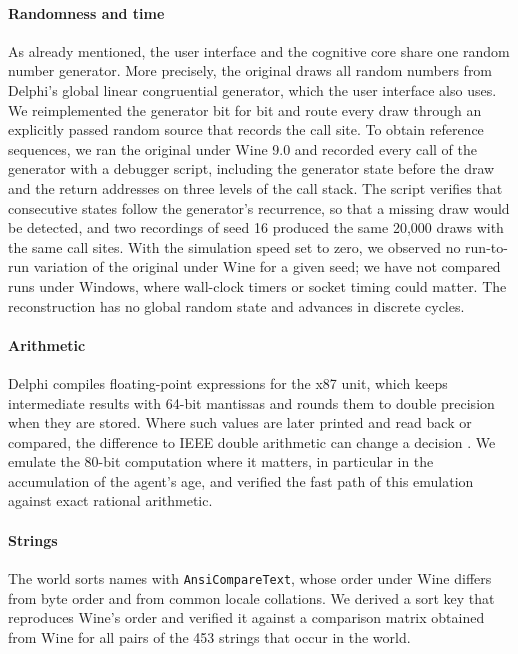 \documentclass[preprint,12pt,authoryear]{elsarticle}
\newcommand{\code}[1]{\texttt{#1}}
\begin{document}
\paragraph{Randomness and time} As already mentioned, the user interface and the cognitive core share one random number generator. More precisely, the original draws all random numbers from Delphi's global linear congruential generator, which the user interface also uses. We reimplemented the generator bit for bit and route every draw through an explicitly passed random source that records the call site. To obtain reference sequences, we ran the original under Wine 9.0 and recorded every call of the generator with a debugger script, including the generator state before the draw and the return addresses on three levels of the call stack. The script verifies that consecutive states follow the generator's recurrence, so that a missing draw would be detected, and two recordings of seed 16 produced the same 20{,}000 draws with the same call sites. With the simulation speed set to zero, we observed no run-to-run variation of the original under Wine for a given seed; we have not compared runs under Windows, where wall-clock timers or socket timing could matter. The reconstruction has no global random state and advances in discrete cycles.

\paragraph{Arithmetic} Delphi compiles floating-point expressions for the x87 unit, which keeps intermediate results with 64-bit mantissas and rounds them to double precision when they are stored. Where such values are later printed and read back or compared, the difference to IEEE double arithmetic can change a decision \citep{monniaux2008pitfalls}. We emulate the 80-bit computation where it matters, in particular in the accumulation of the agent's age, and verified the fast path of this emulation against exact rational arithmetic.

\paragraph{Strings} The world sorts names with \code{AnsiCompareText}, whose order under Wine differs from byte order and from common locale collations. We derived a sort key that reproduces Wine's order and verified it against a comparison matrix obtained from Wine for all pairs of the 453 strings that occur in the world.
\end{document}
